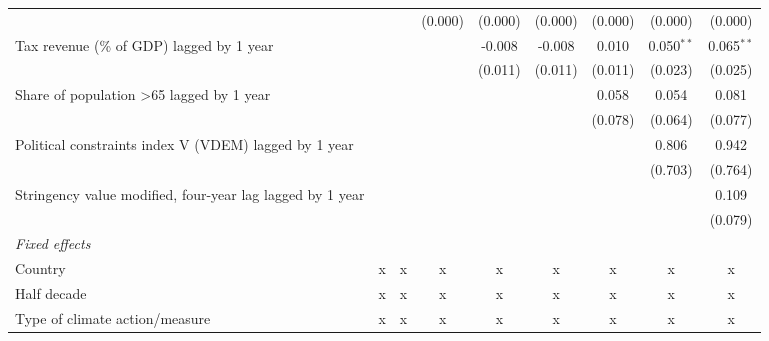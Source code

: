 \begin{tabular}{lcccccccc}
                                                                 &              &              & (0.000)      & (0.000)      & (0.000)      & (0.000) & (0.000)      & (0.000)\\   
   Tax revenue (\% of GDP) lagged by 1 year                      &              &              &              & -0.008       & -0.008       & 0.010   & 0.050$^{**}$ & 0.065$^{**}$\\   
                                                                 &              &              &              & (0.011)      & (0.011)      & (0.011) & (0.023)      & (0.025)\\   
   Share of population >65 lagged by 1 year                      &              &              &              &              &              & 0.058   & 0.054        & 0.081\\   
                                                                 &              &              &              &              &              & (0.078) & (0.064)      & (0.077)\\   
   Political constraints index V (VDEM) lagged by 1 year         &              &              &              &              &              &         & 0.806        & 0.942\\   
                                                                 &              &              &              &              &              &         & (0.703)      & (0.764)\\   
   Stringency value modified, four-year lag lagged by 1 year     &              &              &              &              &              &         &              & 0.109\\   
                                                                 &              &              &              &              &              &         &              & (0.079)\\   
   \emph{Fixed effects}\\
   Country                                                       & x            & x            & x            & x            & x            & x       & x            & x\\  
   Half decade                                                   & x            & x            & x            & x            & x            & x       & x            & x\\  
   Type of climate action/measure                                & x            & x            & x            & x            & x            & x       & x            & x\\  

\end{tabular}

